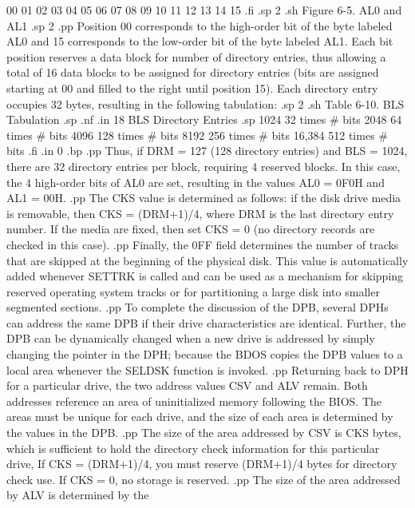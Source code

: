  00  01  02  03  04  05  06  07  08  09  10  11  12  13  14  15
.fi
.sp 2
.sh
                    Figure 6-5.  AL0 and AL1
.sp 2
.pp
Position 00 corresponds to the high-order bit of the byte 
labeled AL0 and 15 corresponds to the low-order bit of the byte 
labeled AL1.  Each bit position reserves a data block for number 
of directory entries, thus allowing a total of 16 data blocks to 
be assigned for directory entries (bits are assigned starting at 
00 and filled to the right until position 15).  Each directory 
entry occupies 32 bytes, resulting in the following tabulation:
.sp 2
.sh
                  Table 6-10.   BLS Tabulation
.sp
.nf
.in 18
 BLS         Directory Entries
.sp
  1024         32 times # bits
  2048         64 times # bits
  4096        128 times # bits 
  8192        256 times # bits
16,384        512 times # bits
.fi
.in 0
.bp
.pp
Thus, if DRM = 127 (128 directory entries) and BLS = 1024, there 
are 32 directory entries per block, requiring 4 reserved blocks.  
In this case, the 4 high-order bits of AL0 are set, resulting in 
the values AL0 = 0F0H and AL1 = 00H.
.pp
The CKS value is determined as follows:  if the disk drive media is 
removable, then CKS = (DRM+1)/4, where DRM is the last directory 
entry number.  If the media are fixed, then set CKS = 0 (no 
directory records are checked in this case).
.pp
Finally, the 0FF field determines the number of tracks that are 
skipped at the beginning of the physical disk.  This value is 
automatically added whenever SETTRK is called and can be used as 
a mechanism for skipping reserved operating system tracks or for 
partitioning a large disk into smaller segmented sections.
.pp
To complete the discussion of the DPB, several DPHs can address 
the same DPB if their drive characteristics are identical.  
Further, the DPB can be dynamically changed when a new drive is 
addressed by simply changing the pointer in the DPH; because the 
BDOS copies the DPB values to a local area whenever the SELDSK 
function is invoked.  
.pp
Returning back to DPH for a particular drive, the two address 
values CSV and ALV remain.  Both addresses reference an area of 
uninitialized memory following the BIOS.  The areas must be 
unique for each drive, and the size of each area is determined by 
the values in the DPB.
.pp
The size of the area addressed by CSV is CKS bytes, which is 
sufficient to hold the directory check information for this 
particular drive,  If CKS = (DRM+1)/4, you must reserve (DRM+1)/4 
bytes for directory check use.  If CKS = 0, no storage is 
reserved.
.pp
The size of the area addressed by ALV is determined by the 
